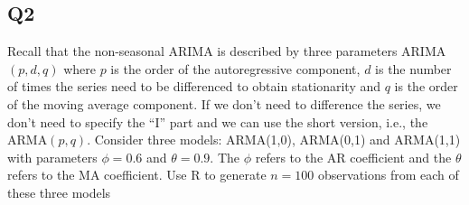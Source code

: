 \documentclass[
]{article}
\begin{document}
\hypertarget{q2}{%
\subsection{Q2}\label{q2}}

Recall that the non-seasonal ARIMA is described by three parameters
ARIMA\((p,d,q)\) where \(p\) is the order of the autoregressive
component, \(d\) is the number of times the series need to be
differenced to obtain stationarity and \(q\) is the order of the moving
average component. If we don't need to difference the series, we don't
need to specify the ``I'' part and we can use the short version, i.e.,
the ARMA\((p,q)\). Consider three models: ARMA(1,0), ARMA(0,1) and
ARMA(1,1) with parameters \(\phi=0.6\) and \(\theta= 0.9\). The \(\phi\)
refers to the AR coefficient and the \(\theta\) refers to the MA
coefficient. Use R to generate \(n=100\) observations from each of these
three models
\end{document}
